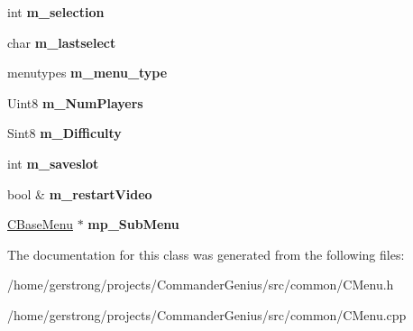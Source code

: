 \begin{DoxyCompactItemize}
\item 
\hypertarget{class_c_menu_a6199a9a192d5d37378fa9cece7c7e501}{
int {\bfseries m\_\-selection}}
\label{class_c_menu_a6199a9a192d5d37378fa9cece7c7e501}

\item 
\hypertarget{class_c_menu_a0195ae5b6b509cd26a6bd03439a7ed8a}{
char {\bfseries m\_\-lastselect}}
\label{class_c_menu_a0195ae5b6b509cd26a6bd03439a7ed8a}

\item 
\hypertarget{class_c_menu_aa46337289db1e3f646059d96def20b40}{
menutypes {\bfseries m\_\-menu\_\-type}}
\label{class_c_menu_aa46337289db1e3f646059d96def20b40}

\item 
\hypertarget{class_c_menu_ace05a07a9eac47fb8d991b77ff6c69b5}{
Uint8 {\bfseries m\_\-NumPlayers}}
\label{class_c_menu_ace05a07a9eac47fb8d991b77ff6c69b5}

\item 
\hypertarget{class_c_menu_a1f10077af3d0317d2027959c1c989e4d}{
Sint8 {\bfseries m\_\-Difficulty}}
\label{class_c_menu_a1f10077af3d0317d2027959c1c989e4d}

\item 
\hypertarget{class_c_menu_a8cbba55a089ec14b3f11797a21073b26}{
int {\bfseries m\_\-saveslot}}
\label{class_c_menu_a8cbba55a089ec14b3f11797a21073b26}

\item 
\hypertarget{class_c_menu_a46386cae97719fe962c59e2f4c545edc}{
bool \& {\bfseries m\_\-restartVideo}}
\label{class_c_menu_a46386cae97719fe962c59e2f4c545edc}

\item 
\hypertarget{class_c_menu_ac7bf577bfa137801907f2d9c94d27143}{
\hyperlink{class_c_base_menu}{CBaseMenu} $\ast$ {\bfseries mp\_\-SubMenu}}
\label{class_c_menu_ac7bf577bfa137801907f2d9c94d27143}

\end{DoxyCompactItemize}


The documentation for this class was generated from the following files:\begin{DoxyCompactItemize}
\item 
/home/gerstrong/projects/CommanderGenius/src/common/CMenu.h\item 
/home/gerstrong/projects/CommanderGenius/src/common/CMenu.cpp\end{DoxyCompactItemize}
